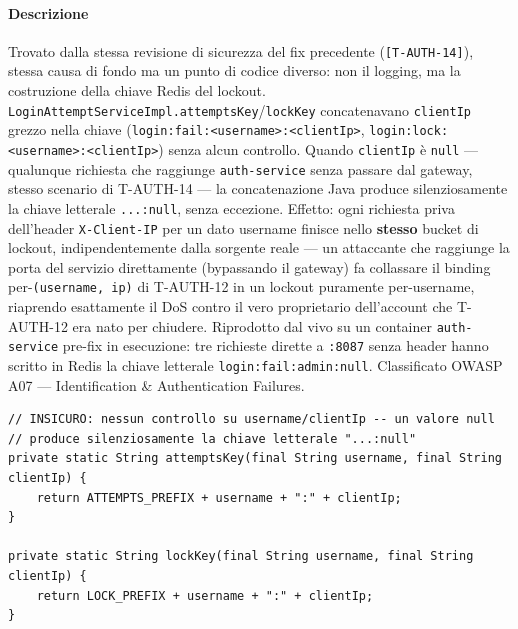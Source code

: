 ﻿\documentclass[a4paper,12pt]{report}
\newcommand{\threat}[1]{\texttt{\small\textcolor{vulnred}{[#1]}}}
\begin{document}
\paragraph{Descrizione}
Trovato dalla stessa revisione di sicurezza del fix precedente
(\threat{T-AUTH-14}), stessa causa di fondo ma un punto di codice diverso:
non il logging, ma la costruzione della chiave Redis del lockout.
\texttt{LoginAttemptServiceImpl.attemptsKey}/\texttt{lockKey} concatenavano
\texttt{clientIp} grezzo nella chiave (\texttt{login:fail:<username>:<clientIp>},
\texttt{login:lock:<username>:<clientIp>}) senza alcun controllo. Quando
\texttt{clientIp} è \texttt{null} --- qualunque richiesta che raggiunge
\texttt{auth-service} senza passare dal gateway, stesso scenario di
T-AUTH-14 --- la concatenazione Java produce silenziosamente la chiave
letterale \texttt{...\string:null}, senza eccezione. Effetto: ogni richiesta
priva dell'header \texttt{X-Client-IP} per un dato username finisce nello
\textbf{stesso} bucket di lockout, indipendentemente dalla sorgente reale
--- un attaccante che raggiunge la porta del servizio direttamente
(bypassando il gateway) fa collassare il binding per-\texttt{(username, ip)}
di T-AUTH-12 in un lockout puramente per-username, riaprendo esattamente
il DoS contro il vero proprietario dell'account che T-AUTH-12 era nato
per chiudere. Riprodotto dal vivo su un container \texttt{auth-service}
pre-fix in esecuzione: tre richieste dirette a \texttt{:8087} senza header
hanno scritto in Redis la chiave letterale \texttt{login:fail:admin:null}.
Classificato OWASP A07 --- Identification \& Authentication Failures.

\begin{insecurebox}[title={Codice Vulnerabile --- LoginAttemptServiceImpl.java (baseline)}]
\begin{lstlisting}[style=java]
// INSICURO: nessun controllo su username/clientIp -- un valore null
// produce silenziosamente la chiave letterale "...:null"
private static String attemptsKey(final String username, final String clientIp) {
    return ATTEMPTS_PREFIX + username + ":" + clientIp;
}

private static String lockKey(final String username, final String clientIp) {
    return LOCK_PREFIX + username + ":" + clientIp;
}
\end{lstlisting}
\end{insecurebox}
\end{document}
